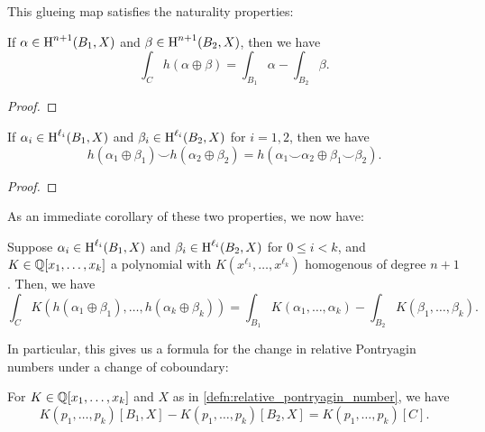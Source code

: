 This glueing map satisfies the naturality properties:

\begin{proposition}\label{prop:variation_naturality_poincare}
	If $\alpha\in \operatorname{H}^{n+1}(B_1, X)$ and $\beta\in \operatorname{H}^{n+1}(B_2,X)$, then we have
	\[
		\int_C h(\alpha\oplus \beta) = \int_{B_1}\alpha - \int_{B_2}\beta.
	\]
\end{proposition}
\begin{proof}
\end{proof}

\begin{proposition}\label{prop:variation_naturality_cup}
	If
	$\alpha_i\in \operatorname{H}^{\ell_i}(B_1,X)$ and $\beta_i \in \operatorname{H}^{\ell_i}(B_2,X)$ for $i=1,2$, then we have
	\[
		h(\alpha_1\oplus\beta_1) \smile h(\alpha_2\oplus \beta_2) = h(\alpha_1\smile \alpha_2 \oplus \beta_1\smile \beta_2).
	\]
\end{proposition}
\begin{proof}
\end{proof}

As an immediate corollary of these two properties, we now have:
\begin{corollary}
	Suppose $\alpha_i\in \operatorname{H}^{\ell_i}(B_1, X)$ and $\beta_i\in \operatorname{H}^{\ell_i}(B_2,X)$ for $0\leq i < k$, and $K\in \mathbb{Q}[x_1,\ldots,x_k]$ a polynomial with $K(x^{\ell_1}, \ldots, x^{\ell_k})$ homogenous of degree $n+1$. Then, we have
	\[
		\int_C K(h(\alpha_1\oplus \beta_1),\ldots, h(\alpha_k\oplus \beta_k))
		=
		\int_{B_1} K(\alpha_1,\ldots, \alpha_k) - \int_{B_2} K(\beta_1,\ldots, \beta_k).
	\]
\end{corollary}

In particular, this gives us a formula for the change in relative Pontryagin numbers under a change of coboundary:
\begin{proposition}\label{prop:relative_pontryagin_number_variation}
	For $K\in \mathbb{Q}[x_1,\ldots, x_k]$ and $X$ as in \cref{defn:relative_pontryagin_number}, we have
	\begin{equation}\label{eq:relative_pontryagin_number_variation}
		K(p_1,\ldots,p_k)[B_1,X] - K(p_1,\ldots, p_k)[B_2,X] = K(p_1,\ldots,p_k)[C].
	\end{equation}
\end{proposition}

